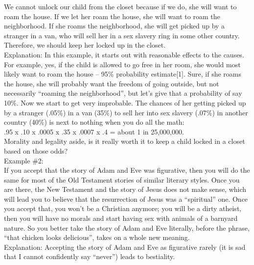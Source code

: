 \documentclass[a4paper,12pt,single,pdftex]{scrbook}
\begin{document}
    
      We cannot unlock our child from the closet because if we do, she will want to roam the house.  If we let her roam the house, she will want to roam the neighborhood.  If she roams the neighborhood, she will get picked up by a stranger in a van, who will sell her in a sex slavery ring in some other country.  Therefore, we should keep her locked up in the closet.
    \\

    
      Explanation: In this example, it starts out with reasonable effects to the causes.  For example, yes, if the child is allowed to go free in her room, she would most likely want to roam the house -- 95\% probability estimate[1].  Sure, if she roams the house, she will probably want the freedom of going outside, but not necessarily “roaming the neighborhood”, but let’s give that a probability of say 10\%.  Now we start to get very improbable.  The chances of her getting picked up by a stranger (.05\%) in a van (35\%) to sell her into sex slavery (.07\%) in another country (40\%) is next to nothing when you do all the math:
    \\

    
      .95 x .10 x .0005 x .35 x .0007 x .4 = about 1 in 25,000,000.
    \\

    
      Morality and legality aside, is it really worth it to keep a child locked in a closet based on those odds?
    \\

    
      Example \#2:
    \\

    
      If you accept that the story of Adam and Eve was figurative, then you will do the same for most of the Old Testament stories of similar literary styles.  Once you are there, the New Testament and the story of Jesus does not make sense, which will lead you to believe that the resurrection of Jesus was a “spiritual” one.  Once you accept that, you won’t be a Christian anymore; you will be a dirty atheist, then you will have no morals and start having sex with animals of a barnyard nature.  So you better take the story of Adam and Eve literally, before the phrase, “that chicken looks delicious”, takes on a whole new meaning.
    \\

    
      Explanation: Accepting the story of Adam and Eve as figurative rarely (it is sad that I cannot confidently say “never”) leads to bestiality.
    \\
\end{document}
